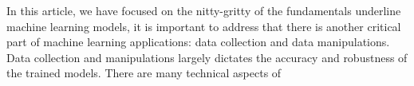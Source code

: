 In this article, we have focused on the nitty-gritty of the fundamentals underline machine learning models, it is important to address that there is another critical part of machine learning applications: data collection and data manipulations. Data collection and manipulations largely dictates the accuracy and robustness of the trained models. There are many technical aspects of 